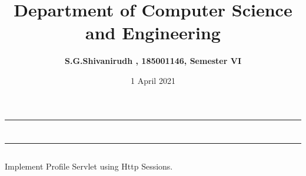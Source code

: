 \documentclass[12pt,letterpaper]{article}
\title{\textbf{Department of Computer Science and Engineering}}
\author{\textbf{S.G.Shivanirudh , 185001146, Semester VI }}
\date{1 April 2021}
\begin{document}
\maketitle
\hrule
\section*{}
\hrule 
\bigskip\bigskip

\subsection*{}

\subsection*{}
\begin{flushleft}
    Implement Profile Servlet using Http Sessions.
\end{flushleft}

\subsection*{}
\subsubsection*{}
\begin{flushleft}

\end{flushleft}

\subsubsection*{}
\begin{flushleft}

\end{flushleft}

\subsubsection*{}
\subsubsection*{}
\begin{flushleft}

\end{flushleft}
\end{document}
